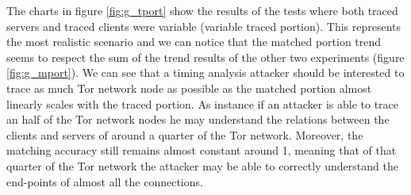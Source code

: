 The charts in figure \ref{fig:g_tport} show the results of the
tests where both traced servers and traced clients were variable
(variable traced portion). This
represents the most realistic scenario and we can notice that the
matched portion trend seems to respect the sum of the trend results of the other
two experiments (figure \ref{fig:g_mport}). We can see that a
timing analysis attacker should be interested to trace as much Tor
network node as possible as the matched portion almost
linearly scales with the traced portion. As instance if an attacker is
able to trace an half of the Tor network nodes he may understand the
relations between the clients and servers of around a quarter of the Tor
network. Moreover, the matching accuracy still remains almost constant
around 1, meaning that of that quarter of the Tor network the attacker
may be able to correctly understand the end-points of almost all the connections.



